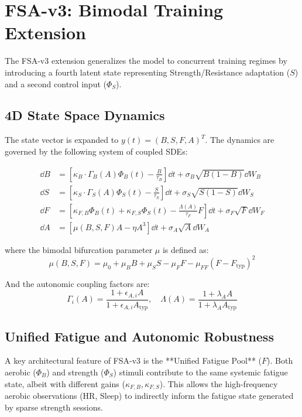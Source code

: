 \section{FSA-v3: Bimodal Training Extension} \label{sec:fsa-v3}

The FSA-v3 extension generalizes the model to concurrent training regimes by introducing a fourth latent state representing Strength/Resistance adaptation ($S$) and a second control input ($\Phi_S$).

\subsection{4D State Space Dynamics}

The state vector is expanded to $y(t) = (B, S, F, A)^T$. The dynamics are governed by the following system of coupled SDEs:

\begin{align}
  \dd B &= \left[\kappa_B \cdot \Gamma_B(A) \Phi_B(t) - \frac{B}{\tau_B}\right] \dd t + \sigma_B \sqrt{B(1-B)} \dd W_B \\
  \dd S &= \left[\kappa_S \cdot \Gamma_S(A) \Phi_S(t) - \frac{S}{\tau_S}\right] \dd t + \sigma_S \sqrt{S(1-S)} \dd W_S \\
  \dd F &= \left[\kappa_{F,B} \Phi_B(t) + \kappa_{F,S} \Phi_S(t) - \frac{\Lambda(A)}{\tau_F} F\right] \dd t + \sigma_F \sqrt{F} \dd W_F \\
  \dd A &= \left[\mu(B, S, F) A - \eta A^3\right] \dd t + \sigma_A \sqrt{A} \dd W_A
\end{align}

where the bimodal bifurcation parameter $\mu$ is defined as:
\begin{equation}
  \mu(B, S, F) = \mu_0 + \mu_B B + \mu_S S - \mu_F F - \mu_{FF}(F - F_{\mathrm{typ}})^2
\end{equation}

And the autonomic coupling factors are:
\begin{equation}
    \Gamma_i(A) = \frac{1 + \epsilon_{A,i} A}{1 + \epsilon_{A,i} A_{\mathrm{typ}}}, \quad \Lambda(A) = \frac{1 + \lambda_A A}{1 + \lambda_A A_{\mathrm{typ}}}
\end{equation}

\subsection{Unified Fatigue and Autonomic Robustness}

A key architectural feature of FSA-v3 is the **Unified Fatigue Pool** ($F$). Both aerobic ($\Phi_B$) and strength ($\Phi_S$) stimuli contribute to the same systemic fatigue state, albeit with different gains ($\kappa_{F,B}, \kappa_{F,S}$). This allows the high-frequency aerobic observations (HR, Sleep) to indirectly inform the fatigue state generated by sparse strength sessions.

